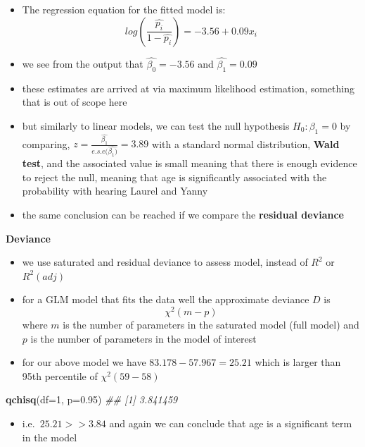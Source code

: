 \documentclass[
]{book}
\newenvironment{Shaded}{\begin{snugshade}}{\end{snugshade}}
\newcommand{\CommentTok}[1]{\textcolor[rgb]{0.56,0.35,0.01}{\textit{#1}}}
\newcommand{\DataTypeTok}[1]{\textcolor[rgb]{0.13,0.29,0.53}{#1}}
\newcommand{\DecValTok}[1]{\textcolor[rgb]{0.00,0.00,0.81}{#1}}
\newcommand{\FloatTok}[1]{\textcolor[rgb]{0.00,0.00,0.81}{#1}}
\newcommand{\KeywordTok}[1]{\textcolor[rgb]{0.13,0.29,0.53}{\textbf{#1}}}
\newcommand{\NormalTok}[1]{#1}
\providecommand{\tightlist}{%
  \setlength{\itemsep}{0pt}\setlength{\parskip}{0pt}}
\theoremstyle{definition}
\theoremstyle{definition}
\theoremstyle{definition}
\theoremstyle{remark}
\begin{document}
\begin{itemize}
\tightlist
\item
  The regression equation for the fitted model is:
  \[log(\frac{\hat{p_i}}{1-\hat{p_i}})=-3.56  +  0.09x_i\]
\item
  we see from the output that \(\hat{\beta_0} = -3.56\) and \(\hat{\beta_1} = 0.09\)
\item
  these estimates are arrived at via maximum likelihood estimation, something that is out of scope here
\item
  but similarly to linear models, we can test the null hypothesis \(H_0:\beta_1=0\) by comparing, \(z = \frac{\hat{\beta_1}}{e.s.e(\hat{\beta_1)}} = 3.89\) with a standard normal distribution, \textbf{Wald test}, and the associated value is small meaning that there is enough evidence to reject the null, meaning that age is significantly associated with the probability with hearing Laurel and Yanny
\item
  the same conclusion can be reached if we compare the \textbf{residual deviance}
\end{itemize}

\textbf{Deviance}

\begin{itemize}
\tightlist
\item
  we use saturated and residual deviance to assess model, instead of \(R^2\) or \(R^2(adj)\)
\item
  for a GLM model that fits the data well the approximate deviance \(D\) is
  \[\chi^2(m-p)\] where \(m\) is the number of parameters in the saturated model (full model) and \(p\) is the number of parameters in the model of interest
\item
  for our above model we have \(83.178 - 57.967 = 25.21\) which is larger than 95th percentile of \(\chi^2(59-58)\)
\end{itemize}

\begin{Shaded}
\begin{Highlighting}[]
\KeywordTok{qchisq}\NormalTok{(}\DataTypeTok{df=}\DecValTok{1}\NormalTok{, }\DataTypeTok{p=}\FloatTok{0.95}\NormalTok{)}
\CommentTok{\#\# [1] 3.841459}
\end{Highlighting}
\end{Shaded}

\begin{itemize}
\tightlist
\item
  i.e.~\(25.21 >> 3.84\) and again we can conclude that age is a significant term in the model
\end{itemize}
\end{document}
